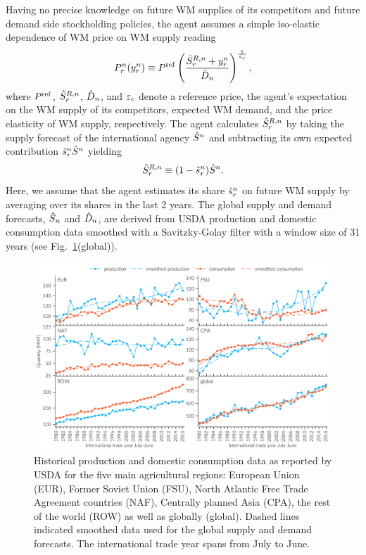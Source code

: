 Having no precise knowledge on future WM supplies of its competitors and future demand side
stockholding policies, the agent assumes a simple iso-elastic dependence of WM price on WM supply
reading
\begin{equation}
  \label{eq:exp_WM_price}
P_r^n(y_r^n)\equiv P^{\operatorname{ref}} \left(\frac{\hat{S}_r^{R,n}+y_r^n}{\hat{D}_n} \right)^{\frac{1}{\varepsilon_c}},
\end{equation}
where $P^{\operatorname{ref}}$, $\hat{S}_r^{R,n}$, $\hat{D}_n$, and $\varepsilon_c$ denote a reference price, the agent's expectation
on the WM supply of its competitors, expected WM demand, and the price elasticity of WM supply,
respectively. The agent calculates $\hat{S}_r^{R,n}$ by taking the supply forecast of the international
agency $\hat{S}^n$ and subtracting its own expected contribution $\hat{s}_r^n \hat{S}^n$ yielding
\begin{equation}
  \label{eq:SROW}
  \hat{S}^{R,n}_r \equiv (1- \hat{s}_r^n) \hat{S}^n.
\end{equation}
Here, we assume that the agent estimates its share $\hat{s}_r^n$ on future WM supply by averaging over
its shares in the last 2 years. The global supply and demand forecasts, $\hat{S}_n$ and $\hat{D}_n$, are
derived from USDA production and domestic consumption data smoothed with a Savitzky-Golay filter
with a window size of 31 years (see Fig.~\ref{fig:supProd_and_cons}(global)).
\begin{figure}[htbp]
  \centering \includegraphics[width=.8\textwidth]{plots/USDA_supply_and_demand/prod_cons_1980_2016.pdf}
  \caption{Historical production and domestic consumption data as reported by USDA for the five main
    agricultural regions: European Union (EUR), Former Soviet Union (FSU), North Atlantic Free Trade
    Agreement countries (NAF), Centrally planned Asia (CPA), the rest of the world (ROW) as well
    as globally (global). Dashed lines indicated smoothed data used for the global supply and demand
    forecasts. The international trade year spans from July to June.}
  \label{fig:supProd_and_cons}
\end{figure}

